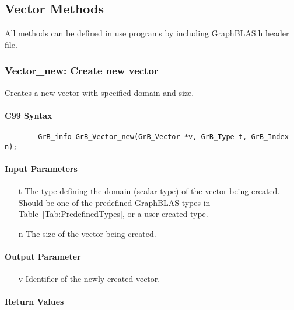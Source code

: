 \subsection{Vector Methods}

All methods can be defined in use programs by including {\sf GraphBLAS.h} header file.

\subsubsection{{\sf Vector\_new}: Create new vector}

Creates a new vector with specified domain and size.

\paragraph{C99 Syntax}

\begin{verbatim}
        GrB_info GrB_Vector_new(GrB_Vector *v, GrB_Type t, GrB_Index n);
\end{verbatim}

\paragraph{Input Parameters}

\begin{itemize}[leftmargin=1.1in]
    \item[{\sf t}] The type defining the domain (scalar type) of the vector being created.
    Should be one of the predefined
    GraphBLAS types in Table~\ref{Tab:PredefinedTypes}, or a user created type.
    \item[{\sf n}] The size of the vector being created.
\end{itemize}

\paragraph{Output Parameter}

\begin{itemize}[leftmargin=1.1in]
    \item[{\sf v}] Identifier of the newly created vector.
\end{itemize}

\paragraph{Return Values}

